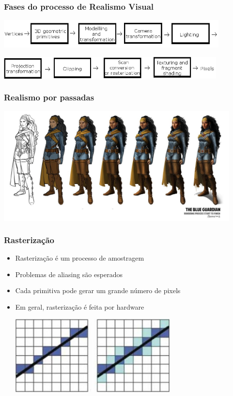 \documentclass{beamer}
\begin{document}
	\begin{frame}
		\frametitle{Fases do processo de Realismo Visual}
		\begin{center}
			\includegraphics[height=1.5cm]{pipeline1.png}
		\end{center}
		\begin{center}
			\includegraphics[height=1.2cm]{pipeline2.png}
		\end{center}
	\end{frame}
	\begin{frame}
		\frametitle{Realismo por passadas}
		\begin{center}
			\includegraphics[height=6cm]{guarda.png}
		\end{center}
	\end{frame}
	\begin{frame}
		\frametitle{Rasterização}
		\begin{itemize}
		\item Rasterização é um processo de amostragem
		\item Problemas de aliasing são esperados 
		\item Cada primitiva pode gerar um grande número de pixels 
		\item Em geral, rasterização é feita por hardware
		\begin{center}
			\includegraphics[height=4cm]{Rasterizacao.jpg}
		\end{center}
		\end{itemize}
	\end{frame}
\end{document}
